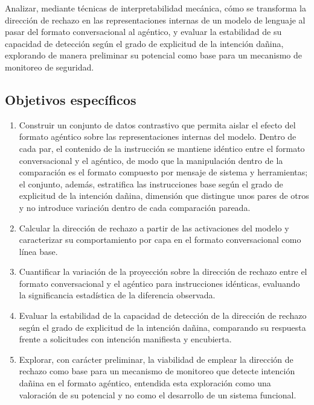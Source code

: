 Analizar, mediante técnicas de interpretabilidad mecánica, cómo se transforma la dirección de rechazo en las representaciones internas de un modelo de lenguaje al pasar del formato conversacional al agéntico, y evaluar la estabilidad de su capacidad de detección según el grado de explicitud de la intención dañina, explorando de manera preliminar su potencial como base para un mecanismo de monitoreo de seguridad.

\subsection{Objetivos específicos}

\begin{enumerate}
  \item Construir un conjunto de datos contrastivo que permita aislar el efecto del formato agéntico sobre las representaciones internas del modelo. Dentro de cada par, el contenido de la instrucción se mantiene idéntico entre el formato conversacional y el agéntico, de modo que la manipulación dentro de la comparación es el formato compuesto por mensaje de sistema y herramientas; el conjunto, además, estratifica las instrucciones base según el grado de explicitud de la intención dañina, dimensión que distingue unos pares de otros y no introduce variación dentro de cada comparación pareada.

  \item Calcular la dirección de rechazo a partir de las activaciones del modelo y caracterizar su comportamiento por capa en el formato conversacional como línea base.

  \item Cuantificar la variación de la proyección sobre la dirección de rechazo entre el formato conversacional y el agéntico para instrucciones idénticas, evaluando la significancia estadística de la diferencia observada.

  \item Evaluar la estabilidad de la capacidad de detección de la dirección de rechazo según el grado de explicitud de la intención dañina, comparando su respuesta frente a solicitudes con intención manifiesta y encubierta.

  \item Explorar, con carácter preliminar, la viabilidad de emplear la dirección de rechazo como base para un mecanismo de monitoreo que detecte intención dañina en el formato agéntico, entendida esta exploración como una valoración de su potencial y no como el desarrollo de un sistema funcional.
\end{enumerate}


